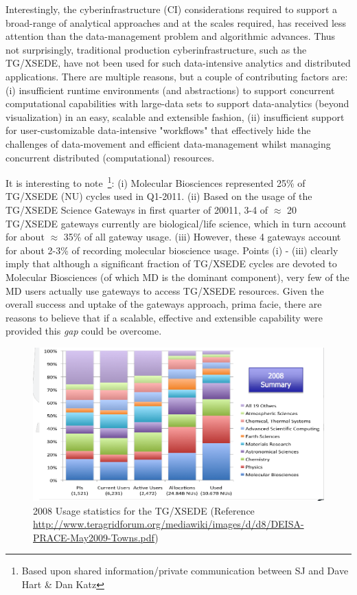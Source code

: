 \documentclass[]{svjour3}
\begin{document}


Interestingly, the cyberinfrastructure (CI) considerations required to
support a broad-range of analytical approaches and at the scales
required, has received less attention than the data-management problem
and algorithmic advances. Thus not surprisingly, traditional
production cyberinfrastructure, such as the TG/XSEDE, have not been used for
such data-intensive analytics and distributed applications. There are
multiple reasons, but a couple of contributing factors are: (i)
insufficient runtime environments (and abstractions) to support
concurrent computational capabilities with large-data sets to support
data-analytics (beyond visualization) in an easy, scalable and
extensible fashion, (ii) insufficient support for user-customizable
data-intensive "workflows" that effectively hide the challenges of
data-movement and efficient data-management whilst managing concurrent
distributed (computational) resources.

It is interesting to note~\footnote{Based upon shared
  information/private communication between SJ and Dave Hart \& Dan
  Katz}: (i) Molecular Biosciences represented 25\% of TG/XSEDE (NU) cycles
used in Q1-2011. (ii) Based on the usage of the TG/XSEDE Science Gateways in first quarter of
20011, 3-4 of $\approx$ 20 TG/XSEDE gateways currently are biological/life
science, which in turn account for about $\approx$ 35\% of all gateway
usage. (iii) However, these 4 gateways account for about 2-3\% of
recording molecular bioscience usage. Points (i) - (iii) clearly imply
that although a significant fraction of TG/XSEDE cycles are devoted to
Molecular Biosciences (of which MD is the dominant component), very
few of the MD users actually use gateways to access TG/XSEDE resources.
Given the overall success and uptake of the gateways approach, prima
facie, there are reasons to believe that if a scalable, effective and
extensible capability were provided this {\it gap} could be overcome.
 
\begin{figure}
 \centering
\includegraphics[scale=0.27]{figures/teragrid-discipline08}
\caption{\small 2008 Usage statistics for the TG/XSEDE (Reference
  \url{http://www.teragridforum.org/mediawiki/images/d/d8/DEISA-PRACE-May2009-Towns.pdf})}
  \label{tg2008}
\end{figure}
\end{document}
